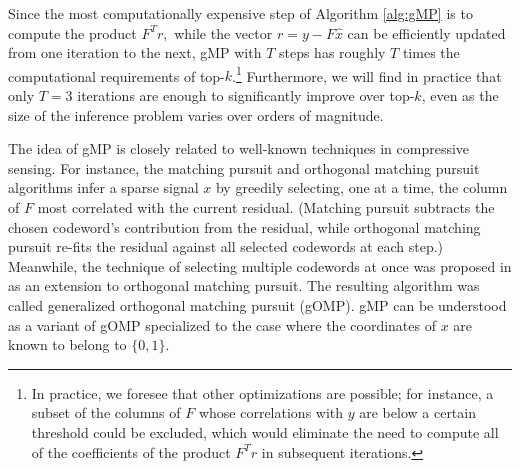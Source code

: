 Since the most computationally expensive step of Algorithm \ref{alg:gMP} is to compute the product $F^T r,$ while the vector $r = y - F \hat x$ can be efficiently updated from one iteration to the next, gMP with $T$ steps has roughly $T$ times the computational requirements of top-$k$.\footnote{In practice, we foresee that other optimizations are possible; for instance, a subset of the columns of $F$ whose correlations with $y$ are below a certain threshold could be excluded, which would eliminate the need to compute all of the coefficients of the product $F^T r$ in subsequent iterations.} Furthermore, we will find in practice that only $T = 3$ iterations are enough to significantly improve over top-$k$, even as the size of the inference problem varies over orders of magnitude.

The idea of gMP is closely related to well-known techniques in compressive sensing. For instance, the matching pursuit \citep{mallat_matching_1993} and orthogonal matching pursuit \citep{tropp_signal_2007} algorithms infer a sparse signal $x$ by greedily selecting, one at a time, the column of $F$ most correlated with the current residual. (Matching pursuit subtracts the chosen codeword's contribution from the residual, while orthogonal matching pursuit re-fits the residual against all selected codewords at each step.) Meanwhile, the technique of selecting multiple codewords at once was proposed in \citet{wang_generalized_2012} as an extension to orthogonal matching pursuit. The resulting algorithm was called generalized orthogonal matching pursuit (gOMP). gMP can be understood as a variant of gOMP specialized to the case where the coordinates of $x$ are known to belong to $\{0, 1\}.$
